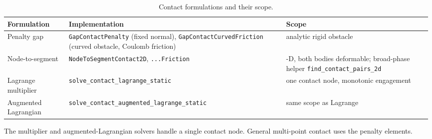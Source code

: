 \begin{table}[t]
\centering\footnotesize
\caption{Contact formulations and their scope.}\label{tab:contact}
\begin{tabular}{>{\raggedright\arraybackslash}p{4.2cm}>{\raggedright\arraybackslash}p{4.3cm}>{\raggedright\arraybackslash}p{4.5cm}}
\toprule
Formulation & Implementation & Scope \\
\midrule
Penalty gap & \texttt{GapContactPenalty} (fixed normal), \texttt{GapContactCurvedFriction} (curved obstacle, Coulomb friction) & analytic rigid obstacle \\
Node-to-segment & \texttt{NodeToSegmentContact2D}, \texttt{...Friction} & 2-D, both bodies deformable; broad-phase helper \texttt{find\_contact\_pairs\_2d} \\
Lagrange multiplier & \texttt{solve\_contact\_\allowbreak lagrange\_\allowbreak static} & one contact node, monotonic engagement \\
Augmented Lagrangian & \texttt{solve\_contact\_\allowbreak augmented\_\allowbreak lagrange\_\allowbreak static} & same scope as Lagrange \\
\bottomrule
\end{tabular}
\end{table}

The multiplier and augmented-Lagrangian solvers handle a single contact node. General multi-point contact uses the penalty elements.
